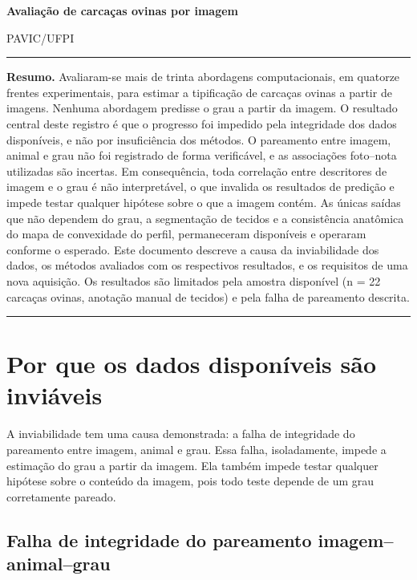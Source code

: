 \documentclass[12pt,a4paper]{article}
\begin{document}
{\LARGE\bfseries Avaliação de carcaças ovinas por imagem\par}
\vspace{0.4em}
{\small PAVIC/UFPI}

\vspace{0.6em}
\hrule
\vspace{0.8em}

\textbf{Resumo.} Avaliaram-se mais de trinta abordagens computacionais, em quatorze
frentes experimentais, para estimar a tipificação de carcaças ovinas a partir de
imagens. Nenhuma abordagem predisse o grau a partir da imagem. O resultado central deste
registro é que o progresso foi impedido pela integridade dos dados disponíveis, e não
por insuficiência dos métodos. O pareamento entre imagem, animal e grau não foi
registrado de forma verificável, e as associações foto--nota utilizadas são incertas. Em
consequência, toda correlação entre descritores de imagem e o grau é não interpretável,
o que invalida os resultados de predição e impede testar qualquer hipótese sobre o que a
imagem contém. As únicas saídas que não dependem do grau, a segmentação de tecidos e a
consistência anatômica do mapa de convexidade do perfil, permaneceram disponíveis e
operaram conforme o esperado. Este documento descreve a causa da inviabilidade dos
dados, os métodos avaliados com os respectivos resultados, e os requisitos de uma nova
aquisição. Os resultados são limitados pela amostra disponível (n = 22 carcaças ovinas,
anotação manual de tecidos) e pela falha de pareamento descrita.

\tableofcontents
\vspace{0.6em}
\hrule

\section{Por que os dados disponíveis são inviáveis}

A inviabilidade tem uma causa demonstrada: a falha de integridade do pareamento entre
imagem, animal e grau. Essa falha, isoladamente, impede a estimação do grau a partir da
imagem. Ela também impede testar qualquer hipótese sobre o conteúdo da imagem, pois todo
teste depende de um grau corretamente pareado.

\subsection{Falha de integridade do pareamento imagem--animal--grau}
\end{document}
